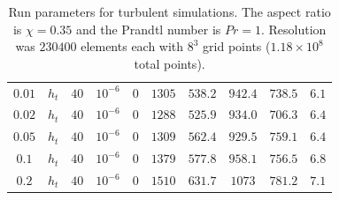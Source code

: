 \begin{table}
\begin{center}
\begin{tabular}{c c c c c c c c c c}
 $0.01$ & $h_{t}$ & $40$ & $10^{-6}$ & 0 &$1305$ & $538.2$ & $942.4$ & $738.5$ & $6.1$ \\
 $0.02$ & $h_{t}$ & $40$ & $10^{-6}$ & 0 &$1288$ & $525.9$ & $934.0$ & $706.3$ & $6.4$ \\
 $0.05$ & $h_{t}$ & $40$ & $10^{-6}$ & 0 &$1309$ & $562.4$ & $929.5$ & $759.1$ & $6.4$ \\
 $0.1$ & $h_{t}$ & $40$ & $10^{-6}$ & 0 &$1379$ & $577.8$ & $958.1$ & $756.5$ & $6.8$ \\
 $0.2$ & $h_{t}$ & $40$ & $10^{-6}$ & 0 &$1510$ & $631.7$ & $1073$ & $781.2$ & $7.1$ \\
 \hline
 \hline
 \end{tabular}
\end{center}
\caption[Run parameters for turbulent simulations]{Run parameters for turbulent simulations. The aspect ratio is $\chi = 0.35$ and the Prandtl number is $Pr = 1$. Resolution was $230400$ elements each with $8^3$ grid points ($1.18\times10^{8}$ total points).}
\label{t:p_space}
\end{table}
